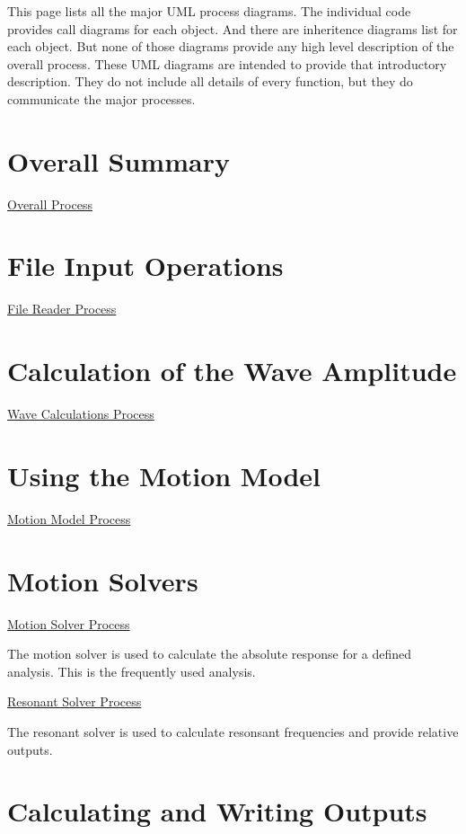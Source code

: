 This page lists all the major U\-M\-L process diagrams. The individual code provides call diagrams for each object. And there are inheritence diagrams list for each object. But none of those diagrams provide any high level description of the overall process. These U\-M\-L diagrams are intended to provide that introductory description. They do not include all details of every function, but they do communicate the major processes.

\section*{Overall Summary}

\hyperlink{uml_overall}{Overall Process}

\section*{File Input Operations}

\hyperlink{uml_filereader}{File Reader Process}

\section*{Calculation of the Wave Amplitude}

\hyperlink{uml_wavecalculation}{Wave Calculations Process}

\section*{Using the Motion Model}

\hyperlink{uml_motionmodel}{Motion Model Process}

\section*{Motion Solvers}

\hyperlink{uml_motionsolver}{Motion Solver Process}

The motion solver is used to calculate the absolute response for a defined analysis. This is the frequently used analysis.

\hyperlink{uml_resonantsolver}{Resonant Solver Process}

The resonant solver is used to calculate resonsant frequencies and provide relative outputs.

\section*{Calculating and Writing Outputs}

